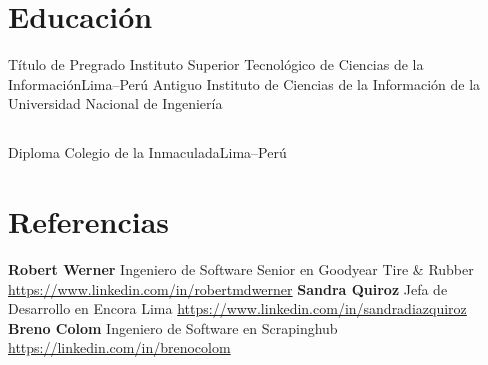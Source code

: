 \documentclass[11pt,a4paper,english]{moderncv}
\begin{document}
\subsection{}

\section{Educación}
    {Título de Pregrado}
    {Instituto Superior Tecnológico de Ciencias de la Información}{Lima--Perú}
    {}{Antiguo Instituto de Ciencias de la Información de la Universidad Nacional de Ingeniería}

\subsection{}

    {Diploma}
    {Colegio de la Inmaculada}{Lima--Perú}
    {}{}

\subsection{}

\section{Referencias}
\cvlistitem
{
    \textbf{Robert Werner}
    \newline{}
    Ingeniero de Software Senior en Goodyear Tire \& Rubber
    \newline{}
    \url{https://www.linkedin.com/in/robertmdwerner}
}
\cvlistitem
{
    \textbf{Sandra Quiroz}
    \newline{}
    Jefa de Desarrollo en Encora Lima
    \newline{}
    \url{https://www.linkedin.com/in/sandradiazquiroz}
}
\cvlistitem
{
    \textbf{Breno Colom}
    \newline{}
    Ingeniero de Software en Scrapinghub
    \newline{}
    \url{https://linkedin.com/in/brenocolom}
}
\end{document}
